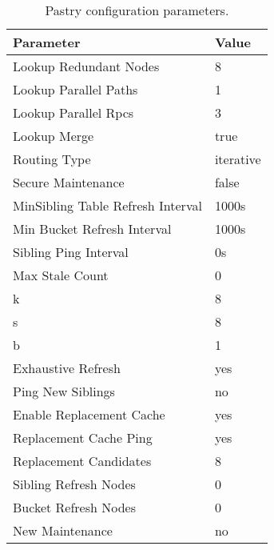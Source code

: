 \begin{table}[phtb]
\centering
\begin{tabular}{|l|l|}
\hline
Parameter                       & Value\\
\hline
Lookup Redundant Nodes          & 8\\
Lookup Parallel Paths           & 1\\
Lookup Parallel Rpcs            & 3\\
Lookup Merge                    & true\\
Routing Type                    & iterative\\
Secure Maintenance              & false\\
MinSibling Table Refresh Interval & 1000s\\
Min Bucket Refresh Interval     & 1000s\\
Sibling Ping Interval           & 0s\\
Max Stale Count                 & 0\\
k                               & 8\\
s                               & 8\\
b                               & 1\\
Exhaustive Refresh              & yes\\
Ping New Siblings               & no\\
Enable Replacement Cache        & yes\\
Replacement Cache Ping          & yes\\
Replacement Candidates          & 8\\
Sibling Refresh Nodes           & 0\\
Bucket Refresh Nodes            & 0\\
New Maintenance                 & no\\
\hline
\end{tabular}
\caption{Pastry configuration parameters.}
\label{tab_kademlia_configs}
\end{table}